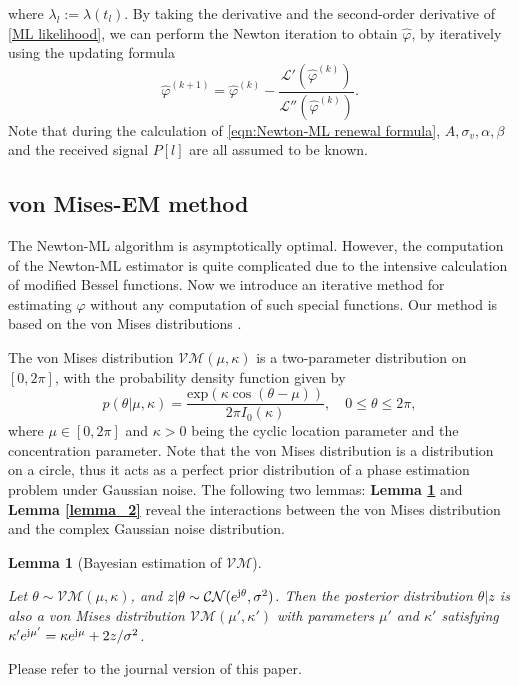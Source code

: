 \documentclass[conference,10pt,twocolumn]{IEEEtran}
\newtheorem{lemma}{\bf Lemma}
\theoremstyle{nonumberplain}
\def \exp {\text{exp}}
\def \CN {\mathcal{CN}}
\def \VM {\mathcal{VM}}
\begin{document}
    where $\lambda_l := \lambda(t_l)$. By taking the derivative and the second-order derivative of \eqref{ML likelihood}, we can perform the Newton iteration to obtain $\hat{\varphi}$, by iteratively using the updating formula
    \begin{equation}
        \hat{\varphi}^{(k+1)} = \hat{\varphi}^{(k)} - \frac{\mathcal{L}'(\hat{\varphi}^{(k)})}{\mathcal{L}''(\hat{\varphi}^{(k)})}.
        \label{eqn:Newton-ML renewal formula}
    \end{equation}
    Note that during the calculation of \eqref{eqn:Newton-ML renewal formula}, $A, \sigma_v, \alpha, \beta$ and the received signal $P[l]$ are all assumed to be known.

\subsection{von Mises-EM method}    \label{von Mises-EM method}
    The Newton-ML algorithm is asymptotically optimal. 
    However, the computation of the Newton-ML estimator is quite complicated due to the intensive calculation of modified Bessel functions. 
    Now we introduce an iterative method for estimating $\varphi$ without any computation of such special functions.
    Our method is based on the von Mises distributions \cite{gatto2007generalized}.

    The von Mises distribution $\VM(\mu, \kappa)$ is a two-parameter distribution on $[0, 2\pi]$, with the probability density function given by 
    \begin{equation}
        p(\theta|\mu, \kappa) = \frac{\exp(\kappa \cos(\theta - \mu))}{2\pi I_0(\kappa)}, \quad 0\leq \theta \leq 2\pi,
    \end{equation}
    where $\mu \in [0,2\pi]$ and $\kappa >0$ being the cyclic location parameter and the concentration parameter. 
    Note that the von Mises distribution is a distribution on a circle, thus it acts as a perfect prior distribution of a phase estimation problem under Gaussian noise. 
    The following two lemmas: {\bf Lemma \ref{lemma_1}} and {\bf Lemma \ref{lemma_2}} reveal the interactions between the von Mises distribution and the complex Gaussian noise distribution.
    \begin{lemma}[Bayesian estimation of $\VM$]\label{lemma_1} \mbox{}\par
        Let $\theta \sim \VM(\mu, \kappa)$, and $z|\theta \sim \CN(e^{{\rm j}\theta}, \sigma^2)$. Then the posterior distribution $\theta | z$ is also a von Mises distribution $\VM(\mu', \kappa')$ with parameters $\mu'$ and $\kappa'$ satisfying $\kappa' e^{{\rm j}\mu'} = \kappa e^{{\rm j}\mu} + 2z/\sigma^2$.
    \end{lemma}
        \begin{IEEEproof}
        Please refer to the journal version of this paper. 
    \end{IEEEproof}
    
\end{document}
